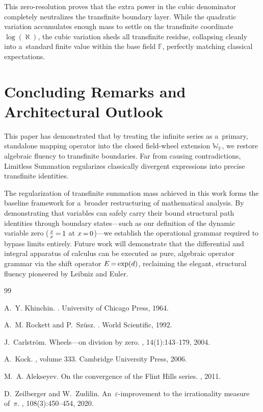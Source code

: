 \documentclass[11pt,a4paper]{article}
\newcommand\nfex{\hspace{-0.2ex}} %
\newcommand\ceq{\nfex=\nfex}
\theoremstyle{definition}
\theoremstyle{noperiod}
\begin{document}
This zero-resolution proves that the extra power in the cubic denominator completely neutralizes the transfinite boundary layer. While the quadratic variation accumulates enough mass to settle on the transfinite coordinate $\log(\aleph)$, the cubic variation sheds all transfinite residue, collapsing cleanly into a~standard finite value within the base field $\mathbb{F}$, perfectly matching classical expectations.

\section{Concluding Remarks and Architectural Outlook}

This paper has demonstrated that by treating the infinite series as a~primary, standalone mapping operator into the closed field-wheel extension $\mathbb{W}_{\mathbb{F}}$, we restore algebraic fluency to transfinite boundaries. Far from causing contradictions, Limitless Summation regularizes classically divergent expressions into precise transfinite identities.

The regularization of transfinite summation mass achieved in this work forms the baseline framework for a~broader restructuring of mathematical analysis. By demonstrating that variables can safely carry their bound structural path identities through boundary states—such as our definition of the dynamic variable zero ($\frac{x}{x} \ceq 1$ at $x \ceq 0$)—we establish the operational grammar required to bypass limits entirely. Future work will demonstrate that the differential and integral apparatus of calculus can be executed as pure, algebraic operator grammar via the shift operator ${E \ceq \exp(d)}$, reclaiming the elegant, structural fluency pioneered by Leibniz and Euler.

\begin{thebibliography}{99}

A.~Y. Khinchin.
.
\newblock University of Chicago Press, 1964.

A.~M. Rockett and P.~Szüsz.
.
\newblock World Scientific, 1992.

J.~Carlström.
\newblock Wheels—on division by zero.
, 14(1):143--179, 2004.

A.~Kock.
, volume 333.
\newblock Cambridge University Press, 2006.


M.~A. Alekseyev.
\newblock On the convergence of the Flint Hills series.
, 2011.

D.~Zeilberger and W.~Zudilin.
\newblock An~$\varepsilon$-improvement to the irrationality measure of~$\pi$.
, 108(3):450--454, 2020.

\end{thebibliography}
\end{document}
